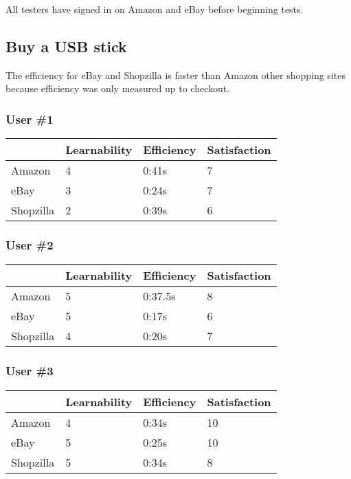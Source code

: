 \documentclass[11pt, oneside]{article}   	%
\begin{document}
All testers have signed in on Amazon and eBay before beginning tests.

\subsection{Buy a USB stick}

The efficiency for eBay and Shopzilla is faster than Amazon other shopping sites because efficiency was only measured up to checkout.

\subsubsection{User \#1}

\begin{tabular}{| l | l | l | l |}
    \hline
     & Learnability & Efficiency & Satisfaction \\ \hline
    Amazon & 4 & 0:41s & 7 \\ \hline
    eBay & 3 & 0:24s & 7 \\ \hline
    Shopzilla & 2 & 0:39s & 6 \\\hline
\end{tabular}

\subsubsection{User \#2}

\begin{tabular}{| l | l | l | l |}
    \hline
     & Learnability & Efficiency & Satisfaction \\ \hline
    Amazon & 5 & 0:37.5s & 8 \\ \hline
    eBay & 5 & 0:17s & 6 \\ \hline
    Shopzilla & 4 & 0:20s & 7 \\ \hline
\end{tabular}

\subsubsection{User \#3}

\begin{tabular}{| l | l | l | l |}
    \hline
     & Learnability & Efficiency & Satisfaction \\ \hline
    Amazon & 4 & 0:34s & 10 \\ \hline
    eBay & 5 & 0:25s & 10 \\ \hline
    Shopzilla & 5 & 0:34s & 8 \\ \hline
\end{tabular}
\end{document}
